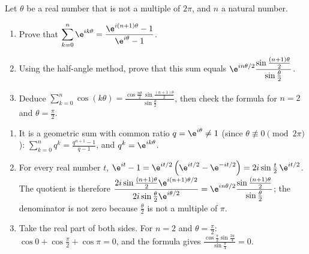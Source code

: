 \begin{exercise}
Let $\theta$ be a real number that is not a multiple of $2\pi$, and $n$ a natural number.
\begin{enumerate}
\item Prove that $\displaystyle\sum_{k=0}^{n}\e^{ik\theta}=\frac{\e^{i(n+1)\theta}-1}{\e^{i\theta}-1}$.
\item Using the half-angle method, prove that this sum equals $\e^{in\theta/2}\dfrac{\sin\frac{(n+1)\theta}2}{\sin\frac\theta2}$.
\item Deduce $\displaystyle\sum_{k=0}^{n}\cos(k\theta)=\frac{\cos\frac{n\theta}2\,\sin\frac{(n+1)\theta}2}{\sin\frac\theta2}$, then check the formula for $n=2$ and $\theta=\frac\pi2$.
\end{enumerate}
\end{exercise}
\begin{solution}
\begin{enumerate}
\item It is a geometric sum with common ratio $q=\e^{i\theta}\neq1$ (since $\theta\not\equiv0\pmod{2\pi}$): $\sum_{k=0}^nq^k=\frac{q^{n+1}-1}{q-1}$, and $q^k=\e^{ik\theta}$.
\item For every real number $t$, $\e^{it}-1=\e^{it/2}\left(\e^{it/2}-\e^{-it/2}\right)=2i\sin\frac t2\,\e^{it/2}$. The quotient is therefore $\dfrac{2i\sin\frac{(n+1)\theta}2\e^{i(n+1)\theta/2}}{2i\sin\frac\theta2\e^{i\theta/2}}=\e^{in\theta/2}\dfrac{\sin\frac{(n+1)\theta}2}{\sin\frac\theta2}$; the denominator is not zero because $\frac\theta2$ is not a multiple of $\pi$.
\item Take the real part of both sides. For $n=2$ and $\theta=\frac\pi2$: $\cos0+\cos\frac\pi2+\cos\pi=0$, and the formula gives $\frac{\cos\frac\pi2\sin\frac{3\pi}4}{\sin\frac\pi4}=0$.
\end{enumerate}
\end{solution}

\mxnewpage
